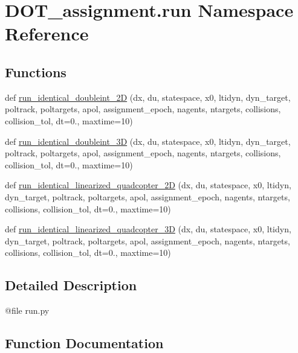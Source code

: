 \hypertarget{namespace_d_o_t__assignment_1_1run}{}\section{D\+O\+T\+\_\+assignment.\+run Namespace Reference}
\label{namespace_d_o_t__assignment_1_1run}
\subsection*{Functions}
\begin{DoxyCompactItemize}
\item 
def \mbox{\hyperlink{namespace_d_o_t__assignment_1_1run_a02a0329e9728e2d5682cfc699beceea3}{run\+\_\+identical\+\_\+doubleint\+\_\+2D}} (dx, du, statespace, x0, ltidyn, dyn\+\_\+target, poltrack, poltargets, apol, assignment\+\_\+epoch, nagents, ntargets, collisions, collision\+\_\+tol, dt=0., maxtime=10)
\item 
def \mbox{\hyperlink{namespace_d_o_t__assignment_1_1run_a434c7b44eb065ea4df4e503d0080a442}{run\+\_\+identical\+\_\+doubleint\+\_\+3D}} (dx, du, statespace, x0, ltidyn, dyn\+\_\+target, poltrack, poltargets, apol, assignment\+\_\+epoch, nagents, ntargets, collisions, collision\+\_\+tol, dt=0., maxtime=10)
\item 
def \mbox{\hyperlink{namespace_d_o_t__assignment_1_1run_a92c3a0505db2434203e6b5625afe42b0}{run\+\_\+identical\+\_\+linearized\+\_\+quadcopter\+\_\+2D}} (dx, du, statespace, x0, ltidyn, dyn\+\_\+target, poltrack, poltargets, apol, assignment\+\_\+epoch, nagents, ntargets, collisions, collision\+\_\+tol, dt=0., maxtime=10)
\item 
def \mbox{\hyperlink{namespace_d_o_t__assignment_1_1run_a85709b22a344bedd9fdb16351ec5187e}{run\+\_\+identical\+\_\+linearized\+\_\+quadcopter\+\_\+3D}} (dx, du, statespace, x0, ltidyn, dyn\+\_\+target, poltrack, poltargets, apol, assignment\+\_\+epoch, nagents, ntargets, collisions, collision\+\_\+tol, dt=0., maxtime=10)
\end{DoxyCompactItemize}


\subsection{Detailed Description}
\begin{DoxyVerb}@file run.py
\end{DoxyVerb}
 

\subsection{Function Documentation}
\mbox{\label{namespace_d_o_t__assignment_1_1run_a02a0329e9728e2d5682cfc699beceea3}} 
